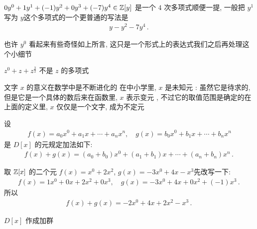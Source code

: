 \begin{example}
    $0y^0 + 1y^1 + (-1)y^2 + 0y^3 + (-7)y^4 \in \mathbb{Z}[y]$ 是一个 $4$ 次多项式\period 顺便一提, 一般把 $y^1$ 写为 $y$\period 这个多项式的一个更普通的写法是
    \begin{align*}
        y - y^2 - 7y^4 \period
    \end{align*}

    也许 $y^0$ 看起来有些奇怪\period 如上所言, 这只是一个形式上的表达式\period 我们之后再处理这个小细节\period
\end{example}

\begin{example}
    $z^0 + z + z^{\frac{3}{2}}$ 不是 $z$ 的多项式\period
\end{example}

\begin{remark}
    文字 $x$ 的意义在数学中是不断进化的 \period 在中小学里, $x$ 是未知元 : 虽然它是待求的, 但是它是一个具体的数\period 后来在函数里, $x$ 表示变元 , 不过它的取值范围是确定的\period 在上面的定义里, $x$ 仅仅是一个文字, 成为不定元\period
\end{remark}

\begin{definition}
    设
    \begin{align*}
        f(x) = a_0 x^0 + a_1 x + \cdots + a_n x^n, \quad g(x) = b_0 x^0 + b_1 x + \cdots + b_n x^n
    \end{align*}
    是 $D[x]$ 的元\period 规定加法如下:
    \begin{align*}
        f(x) + g(x) = (a_0 + b_0) x^0 + (a_1 + b_1) x + \cdots + (a_n + b_n) x^n \period
    \end{align*}
\end{definition}

\begin{example}
    取 $\mathbb{Z}[x]$ 的二个元 $f(x)=x^0 + 2x^2$, $g(x)=-3x^0 + 4x - x^3$\period 先改写一下:
    \begin{align*}
        f(x) = 1x^0 + 0x + 2x^2 + 0x^3, \quad g(x) = -3x^0 + 4x + 0x^2 + (-1)x^3 \period
    \end{align*}
    所以
    \begin{align*}
        f(x) + g(x) = -2x^0 + 4x + 2x^2 - x^3 \period
    \end{align*}
\end{example}

\begin{proposition}
    $D[x]$ 作成加群\period
\end{proposition}

